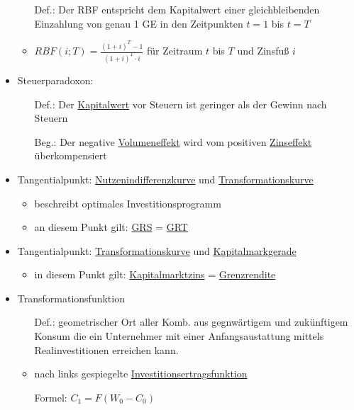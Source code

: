\begin{itemize}
			\begin{itemize}
				\item[Def.:] Der RBF entspricht dem Kapitalwert einer gleichbleibenden Einzahlung von genau 1 GE in den Zeitpunkten $t=1$ bis $t=T$
				\item $RBF(i;T)=\frac{(1+i)^T-1}{(1+i)^T\cdot i}$ für Zeitraum $t$ bis $T$ und Zinsfuß $i$ 
			\end{itemize}	
		\item Steuerparadoxon: \label{Steuerparadoxon}\\
			\begin{itemize}
				\item[Def.:] Der \hyperref[Kapitalwert]{Kapitalwert} vor Steuern ist geringer als der Gewinn nach Steuern
				\item[Beg.:] Der negative \hyperref[Volumeneffekt]{Volumeneffekt} wird vom positiven \hyperref[Zinseffekt]{Zinseffekt} überkompensiert
			\end{itemize}			
		\item Tangentialpunkt: \hyperref[Nutzenindifferenzkurve]{Nutzenindifferenzkurve} und \hyperref[Transformationskurve]{Transformationskurve} \label{TangNutzUndTrans} \\
			\begin{itemize}
				\item beschreibt optimales Investitionsprogramm
				\item an diesem Punkt gilt: \hyperref[GRS]{GRS} = \hyperref[GRT]{GRT}
			\end{itemize}
		\item Tangentialpunkt: \hyperref[Transformationskurve]{Transformationskurve} und \hyperref[Kapitalmarktgerade]{Kapitalmarkgerade} \label{TangTransUndKap} 
			\begin{itemize}
				\item in diesem Punkt gilt: \hyperref[Zinsfuss]{Kapitalmarktzins} = \hyperref[Grenzrendite]{Grenzrendite}
			\end{itemize}
		\item Transformationsfunktion \label{Transformationskurve}\label{Transformationsfunktion}
			\begin{itemize}
				\item[Def.:] geometrischer Ort aller Komb. aus gegnwärtigem und zukünftigem Konsum die ein Unternehmer mit einer Anfangsaustattung mittels Realinvestitionen erreichen kann.
				\item nach links gespiegelte \hyperref[Investitionsertragsfunktion]{Investitionsertragsfunktion}
				\item[Formel:] $C_1=F(W_0-C_0)$		

\end{itemize}
\end{itemize}
